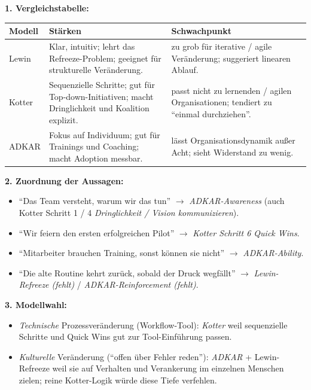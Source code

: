 \documentclass[11pt,a4paper,oneside]{article}
\begin{document}
\begin{loesungbox}
\textbf{1. Vergleichstabelle:}

\smallskip
\begin{tabularx}{\linewidth}{@{}p{1.6cm}XX@{}}
\toprule
\textbf{Modell} & \textbf{St\"arken} & \textbf{Schwachpunkt} \\
\midrule
Lewin    & Klar, intuitiv; lehrt das Refreeze-Problem; geeignet f\"ur strukturelle Ver\"anderung. & zu grob f\"ur iterative / agile Ver\"anderung; suggeriert linearen Ablauf. \\
Kotter   & Sequenzielle Schritte; gut f\"ur Top-down-Initiativen; macht Dringlichkeit und Koalition explizit. & passt nicht zu lernenden / agilen Organisationen; tendiert zu ``einmal durchziehen''. \\
ADKAR    & Fokus auf Individuum; gut f\"ur Trainings und Coaching; macht Adoption messbar. & l\"asst Organisationsdynamik au{\ss}er Acht; sieht Widerstand zu wenig. \\
\bottomrule
\end{tabularx}

\smallskip
\textbf{2. Zuordnung der Aussagen:}
\begin{itemize}
  \item ``Das Team versteht, warum wir das tun'' $\rightarrow$ \emph{ADKAR-Awareness} (auch Kotter Schritt 1 / 4 \emph{Dringlichkeit / Vision kommunizieren}).
  \item ``Wir feiern den ersten erfolgreichen Pilot'' $\rightarrow$ \emph{Kotter Schritt 6 Quick Wins}.
  \item ``Mitarbeiter brauchen Training, sonst k\"onnen sie nicht'' $\rightarrow$ \emph{ADKAR-Ability}.
  \item ``Die alte Routine kehrt zur\"uck, sobald der Druck wegf\"allt'' $\rightarrow$ \emph{Lewin-Refreeze (fehlt)} / \emph{ADKAR-Reinforcement (fehlt)}.
\end{itemize}

\smallskip
\textbf{3. Modellwahl:}
\begin{itemize}
  \item \emph{Technische} Prozess\-ver\"anderung (Workflow-Tool): \emph{Kotter} \textendash{} weil sequenzielle Schritte und Quick Wins gut zur Tool-Einf\"uhrung passen.
  \item \emph{Kulturelle} Ver\"anderung (``offen \"uber Fehler reden''): \emph{ADKAR} + Lewin-Refreeze \textendash{} weil sie auf Verhalten und Verankerung im einzelnen Menschen zielen; reine Kotter-Logik w\"urde diese Tiefe verfehlen.
\end{itemize}
\end{loesungbox}
\end{document}
